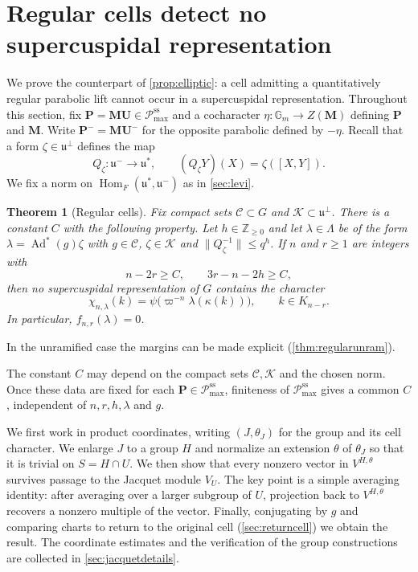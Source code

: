 \documentclass[11pt,reqno]{amsart}
\numberwithin{equation}{section}
\theoremstyle{plain}
\newtheorem{theorem}{Theorem}[section]
\theoremstyle{definition}
\theoremstyle{remark}
\theoremstyle{plain}
\newcommand{\Z}{\mathbb{Z}}      %
\newcommand{\Gm}{\mathbb{G}_m}   %
\newcommand{\Lat}{\mathcal{L}}   %
\newcommand{\dLat}{\Lambda}      %
\newcommand{\bG}{\mathbf{G}}     %
\newcommand{\bP}{\mathbf{P}}     %
\newcommand{\bM}{\mathbf{M}}     %
\newcommand{\bU}{\mathbf{U}}     %
\newcommand{\g}{\mathfrak{g}}    %
\newcommand{\gd}{\mathfrak{g}^*} %
\newcommand{\uu}{\mathfrak{u}}   %
\newcommand{\Pcss}{\mathscr{P}^{\mathrm{ss}}_{\mathrm{max}}}  %
\newcommand{\norm}[1]{\lVert#1\rVert}
\DeclareMathOperator{\Ad}{Ad}
\newcommand{\lf}{\lambda}
\newcommand{\nf}{\zeta}
\begin{document}
\section{Regular cells detect no supercuspidal representation}\label{sec:regular}

We prove the counterpart of \cref{prop:elliptic}: a cell admitting a
quantitatively regular parabolic lift cannot occur in a supercuspidal
representation. Throughout this section, fix $\bP=\bM\bU\in\Pcss$
and a cocharacter $\eta:\Gm\to Z(\bM)$ defining $\bP$ and $\bM$.
Write $\bP^-=\bM\bU^-$ for the opposite parabolic defined by $-\eta$.
Recall that a form $\nf\in\uu^\perp$ defines the map
\[
Q_\nf:\uu^-\longrightarrow\uu^*,\qquad
(Q_{\nf}Y)(X)=\nf([X,Y]).
\]
We fix a norm on $\operatorname{Hom}_F(\uu^*,\uu^-)$ as in \cref{sec:levi}.

\begin{theorem}[Regular cells]\label{thm:regular}
Fix compact sets $\mathcal C\subset G$ and $\mathcal K\subset\uu^\perp$.
There is a constant $C$ with the following property. Let $h\in\Z_{\ge0}$ and let
$\lf\in\dLat$ be of the form $\lf=\Ad^*(g)\nf$ with $g\in\mathcal C$,
$\nf\in\mathcal K$ and $\norm{Q_\nf^{-1}}\le q^h$. If $n$ and $r\ge1$ are integers with
\begin{equation}\label{eq:margins}
n-2r\ge C,\qquad 3r-n-2h\ge C,
\end{equation}
then no supercuspidal representation of $G$ contains the character
\[
\chi_{n,\lf}(k)=\psi\bigl(\varpi^{-n}\lf(\kappa(k))\bigr),
\qquad k\in K_{n-r}.
\]
In particular, $f_{n,r}(\lf)=0$.
\end{theorem}

In the unramified case the margins can be made explicit
(\cref{thm:regularunram}).

The constant $C$ may depend on the compact sets $\mathcal C,\mathcal K$
and the chosen norm. Once these data are fixed for each
$\bP\in\Pcss$, finiteness of $\Pcss$ gives a common $C$, independent
of $n,r,h,\lf$ and $g$.

We first work in product coordinates, writing $(J,\theta_J)$ for the
group and its cell character. We enlarge $J$ to a group $H$ and
normalize an extension $\theta$ of $\theta_J$ so that it is trivial
on $S=H\cap U$.
We then show that every nonzero vector in $V^{H,\theta}$ survives
passage to the Jacquet module $V_U$. The key point is a simple
averaging identity: after averaging over a larger subgroup of $U$,
projection back to $V^{H,\theta}$ recovers a nonzero multiple of
the vector. Finally, conjugating by $g$ and comparing charts to return to the original
cell (\cref{sec:returncell}) we obtain the result. The coordinate estimates and the
verification of the group constructions are collected in
\cref{sec:jacquetdetails}.
\end{document}

